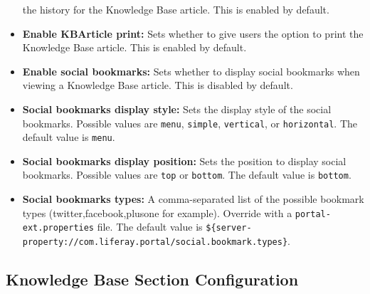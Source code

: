 \begin{itemize}
  the history for the Knowledge Base article. This is enabled by
  default.
\item
  \textbf{Enable KBArticle print:} Sets whether to give users the option
  to print the Knowledge Base article. This is enabled by default.
\item
  \textbf{Enable social bookmarks:} Sets whether to display social
  bookmarks when viewing a Knowledge Base article. This is disabled by
  default.
\item
  \textbf{Social bookmarks display style:} Sets the display style of the
  social bookmarks. Possible values are \texttt{menu}, \texttt{simple},
  \texttt{vertical}, or \texttt{horizontal}. The default value is
  \texttt{menu}.
\item
  \textbf{Social bookmarks display position:} Sets the position to
  display social bookmarks. Possible values are \texttt{top} or
  \texttt{bottom}. The default value is \texttt{bottom}.
\item
  \textbf{Social bookmarks types:} A comma-separated list of the
  possible bookmark types (twitter,facebook,plusone for example).
  Override with a \texttt{portal-ext.properties} file. The default value
  is
  \texttt{\$\{server-property://com.liferay.portal/social.bookmark.types\}}.
\end{itemize}

\subsection{Knowledge Base Section
Configuration}\label{knowledge-base-section-configuration}

